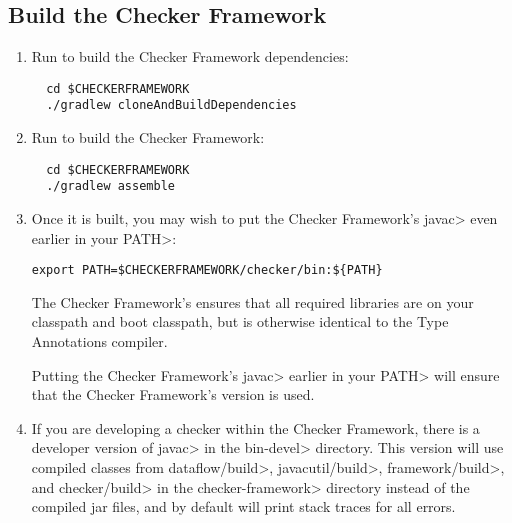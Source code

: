 \subsection{Build the Checker Framework\label{building}}


\begin{enumerate}

\item
Run  to build the Checker Framework dependencies:

\begin{Verbatim}
  cd $CHECKERFRAMEWORK
  ./gradlew cloneAndBuildDependencies
\end{Verbatim}

\item
Run  to build the Checker Framework:

\begin{Verbatim}
  cd $CHECKERFRAMEWORK
  ./gradlew assemble
\end{Verbatim}

\item
Once it is built, you may wish to put the Checker Framework's \<javac>
even earlier in your \<PATH>:

\begin{Verbatim}
export PATH=$CHECKERFRAMEWORK/checker/bin:${PATH}
\end{Verbatim}

The Checker Framework's  ensures that all required
libraries are on your classpath and boot classpath, but is otherwise
identical to the Type Annotations compiler.

Putting the Checker Framework's \<javac> earlier in your \<PATH> will
ensure that the Checker Framework's version is used.

\item
If you are developing a checker within the Checker Framework, there is
a developer version of \<javac> in the \<bin-devel> directory. This
version will use compiled classes from \<dataflow/build>,
\<javacutil/build>, \<framework/build>,
and \<checker/build> in the \<checker-framework> directory instead of
the compiled jar files, and by default will print stack traces for all
errors.


\end{enumerate}
